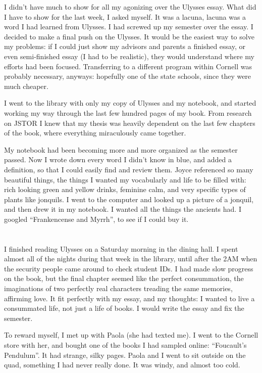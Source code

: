 I didn't have much to show for all my agonizing over the Ulysses essay.  What
did I have to show for the last week, I asked myself.  It was a lacuna, lacuna
was a word I had learned from Ulysses. I had screwed up my semester over the
essay.  I decided to make a final push on the Ulysses.  It would be the easiest
way to solve my problems: if I could just show my advisors and parents a
finished essay, or even semi-finished essay (I had to be realistic), they would
understand where my efforts had been focused.  Transferring to a different
program within Cornell was probably necessary, anyways: hopefully one of the
state schools, since they were much cheaper.

I went to the library with only my copy of Ulysses and my notebook, and started
working my way through the last few hundred pages of my book.  From research on
JSTOR I knew that my thesis was heavily dependent on the last few chapters of
the book, where everything miraculously came together.

My notebook had been becoming more and more organized as the semester passed.
Now I wrote down every word I didn't know in blue, and added a definition, so
that I could easily find and review them.  Joyce referenced so many beautiful
things, the things I wanted my vocabularly and life to be filled with: rich
looking green and yellow drinks, feminine calm, and very specific types of
plants like jonquils.  I went to the computer and looked up a picture of a
jonquil, and then drew it in my notebook.  I wanted all the things the ancients
had.  I googled ``Frankencense and Myrrh'', to see if I could buy it.


\section{}

I finished reading Ulysses on a Saturday morning in the dining hall.   I spent
almost all of the nights during that week in the library, until after the 2AM
when the security people came around to check student IDs.  I had made slow
progress on the book, but the final chapter seemed like the perfect
consummation, the imaginations of two perfectly real characters treading the
same memories, affirming love.  It fit perfectly with my essay, and my thoughts:
I wanted to live a consummated life, not just a life of books.  I would write
the essay and fix the semester.

To reward myself, I met up with Paola (she had texted me).  I went to the Cornell
store with her, and bought one of the books I had sampled online: ``Foucault's
Pendulum''.  It had strange, silky pages.  Paola and I went to sit outside on
the quad, something I had never really done.  It was windy, and almost too cold.


